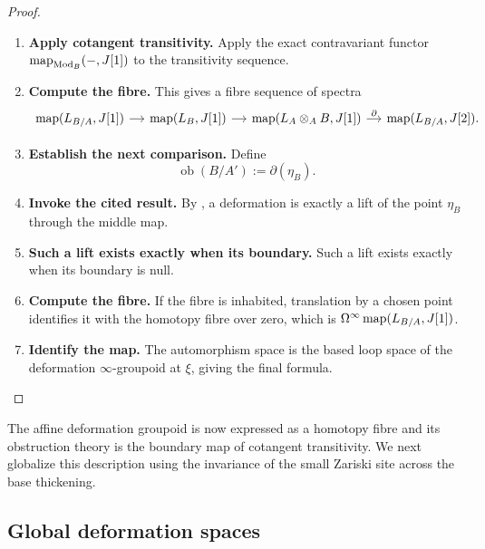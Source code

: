 \begin{proof}
\leavevmode
\begin{enumerate}[label=\textup{(\arabic*)}]
    \item \textbf{Apply cotangent transitivity.}
    Apply the exact contravariant functor \(\operatorname{map}_{\operatorname{Mod}_B}(-,J[1])\) to the transitivity sequence.

    \item \textbf{Compute the fibre.}
    This gives a fibre sequence of spectra
    \[
    \begin{tikzcd}[column sep=small]
        \map(L_{B/A},J[1]) \arrow[r]
            & \map(L_B,J[1]) \arrow[r]
            & \map(L_A\otimes_AB,J[1]) \arrow[r,"\partial"]
            & \map(L_{B/A},J[2]).
    \end{tikzcd}
    \]

    \item \textbf{Establish the next comparison.}
    Define
    \[
        \operatorname{ob}(B/A'):=\partial(\eta_B).
    \]

    \item \textbf{Invoke the cited result.}
    By , a deformation is exactly a lift of the point
    \(\eta_B\) through the middle map.

    \item \textbf{Such a lift exists exactly when its boundary.}
    Such a lift exists exactly when its boundary is null.

    \item \textbf{Compute the fibre.}
    If the fibre is inhabited, translation by a chosen point identifies it with the homotopy
    fibre over zero, which is \(\Omega^\infty\operatorname{map}(L_{B/A},J[1])\).

    \item \textbf{Identify the map.}
    The automorphism space is the based loop space of the deformation \(\infty\)-groupoid at
    \(\xi\), giving the final formula.
\end{enumerate}
\end{proof}
The affine deformation groupoid is now expressed as a homotopy fibre and its
obstruction theory is the boundary map of cotangent transitivity. We next
globalize this description using the invariance of the small Zariski site
across the base thickening.

\subsection{Global deformation spaces}

